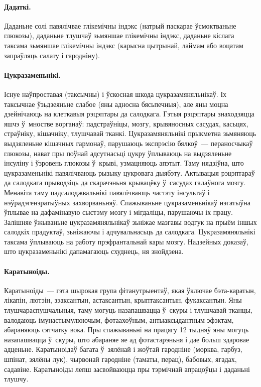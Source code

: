 \paragraph{Дадаткі.}
Даданьне солі павялічвае глікемічны індэкс (натрый паскарае ўсмоктваньне глюкозы), даданьне тлушчаў зьмяншае глікемічны індэкс, даданьне кіслага таксама зьмяншае глікемічны індэкс (карысна цытрынай, лаймам або воцатам запраўляць салату і гародніну).

\paragraph{Цукразаменьнікі.}
Існуе наўпроставая (таксычны) і ўскосная шкода цукразамяняльнікаў. Іх таксычнае ўзьдзеяньне слабое (яны адносна бясьпечныя), але яны моцна дзейнічаюць на клеткавыя рэцэптары да салодкага. Гэтыя рэцэптары знаходзяцца яшчэ ў~мностве ворганаў: падстраўніцы, мозгу, крывяносных сасудах, касьцях, страўніку, кішачніку, тлушчавай тканкі. Цукразамяняльнікі прыкметна зьмяняюць выдзяленьне кішачных гармонаў, парушаюць экспрэсію бялкоў~--- пераносчыкаў глюкозы, нават пры поўнай адсутнасьці цукру ўплываюць на выдзяленьне інсуліну і ўзровень глюкозы ў~крыві, узмацняюць апэтыт. Таму нядзіўна, што цукразаменьнікі павялічваюць рызыку цукровага дыябэту. Актывацыя рэцэптараў да салодкага прыводзіць да скарачэньня крывацёку ў~сасудах галаўнога мозгу. Менавіта таму падсалоджвальнікі павялічваюць частату інсультаў і нэўрадэгенэратыўных захворваньняў. Спажываньне цукразаменьнікаў нэгатыўна ўплывае на дафамінавую сыстэму мозгу і мігдаліцы, парушаючы іх працу. Залішняе ўжываньне цукразамяняльнікаў зьніжае мазгавы водгук на прыём іншых салодкіх прадуктаў, зьніжаючы і адчувальнасьць да салодкага. Цукразамяняльнікі таксама ўплываюць на работу прэфрантальнай кары мозгу. Надзейных доказаў, што цукразаменьнікі дапамагаюць схуднець, ня знойдзена.


\paragraph{Каратыноіды.}
Каратыноіды~--- гэта шырокая група фітанутрыентаў, якая ўключае бэта-каратын, лікапін, лютэін, зэаксантын, астаксантын, крыптаксантын, фукаксантын. Яны тлушчараспушчальныя, таму могуць назапашвацца ў~скуры і тлушчавай тканцы, валодаюць імунастымулюючым, фотаахоўным, антыаксыдантным эфэктам, абараняюць сятчатку вока. Пры спажываньні на працягу 12 тыдняў яны могуць назапашвацца ў~скуры, што абараняе яе ад фотастарэньня і дае больш здаровае адценьне. Каратыноідаў багата ў~зялёнай і жоўтай гародніне (морква, гарбуз, шпінат, зялёны лук), чырвонай гародніне (таматы, перац), бабовых, ягадах, садавіне. Каратыноіды лепш засвойваюцца пры тэрмічнай апрацоўцы і даданьні тлушчу.

